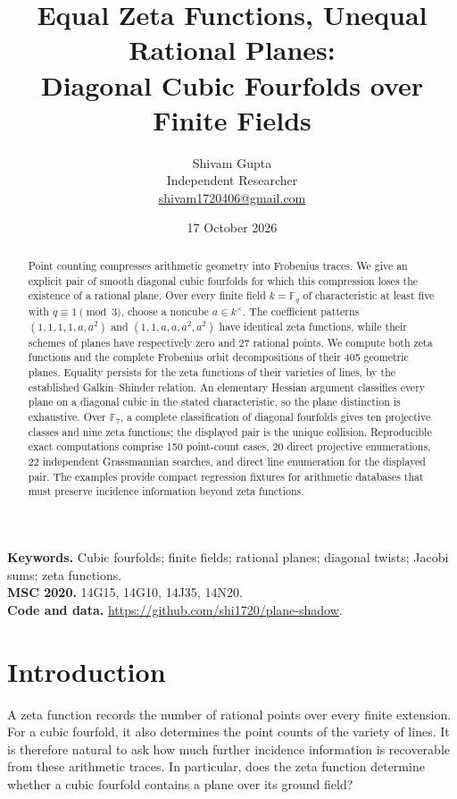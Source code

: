 \documentclass[11pt]{article}
\title{Equal Zeta Functions, Unequal Rational Planes:\\Diagonal Cubic Fourfolds over Finite Fields}
\author{Shivam Gupta\\\small Independent Researcher\\\small\href{mailto:shivam1720406@gmail.com}{shivam1720406@gmail.com}}
\date{17 October 2026}
\theoremstyle{remark}\newtheorem{remark}[theorem]{Remark}
\newcommand{\F}{\mathbb F}\newcommand{\PP}{\mathbb P}\newcommand{\Z}{\mathbb Z}
\begin{document}
\maketitle
\begin{abstract}
Point counting compresses arithmetic geometry into Frobenius traces. We give an explicit pair of smooth diagonal cubic fourfolds for which this compression loses the existence of a rational plane. Over every finite field $k=\F_q$ of characteristic at least five with $q\equiv1\pmod3$, choose a noncube $a\in k^\times$. The coefficient patterns $(1,1,1,1,a,a^2)$ and $(1,1,a,a,a^2,a^2)$ have identical zeta functions, while their schemes of planes have respectively zero and 27 rational points. We compute both zeta functions and the complete Frobenius orbit decompositions of their 405 geometric planes. Equality persists for the zeta functions of their varieties of lines, by the established Galkin--Shinder relation. An elementary Hessian argument classifies every plane on a diagonal cubic in the stated characteristic, so the plane distinction is exhaustive. Over $\F_7$, a complete classification of diagonal fourfolds gives ten projective classes and nine zeta functions; the displayed pair is the unique collision. Reproducible exact computations comprise 150 point-count cases, 20 direct projective enumerations, 22 independent Grassmannian searches, and direct line enumeration for the displayed pair. The examples provide compact regression fixtures for arithmetic databases that must preserve incidence information beyond zeta functions.
\end{abstract}
\noindent\textbf{Keywords.} Cubic fourfolds; finite fields; rational planes; diagonal twists; Jacobi sums; zeta functions.\\
\textbf{MSC 2020.} 14G15, 14G10, 14J35, 14N20.\\
\textbf{Code and data.} \url{https://github.com/shi1720/plane-shadow}.

\section{Introduction}
A zeta function records the number of rational points over every finite extension. For a cubic fourfold, it also determines the point counts of the variety of lines. It is therefore natural to ask how much further incidence information is recoverable from these arithmetic traces. In particular, does the zeta function determine whether a cubic fourfold contains a plane over its ground field?
\end{document}
